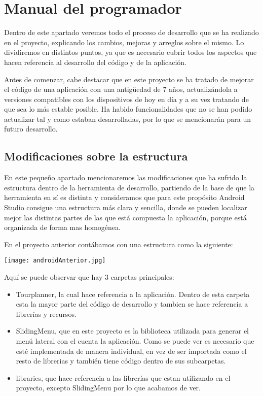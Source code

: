 \section{Manual del programador}

Dentro de este apartado veremos todo el proceso de desarrollo que se ha realizado en el proyecto, explicando los cambios, mejoras y arreglos sobre el mismo. Lo dividiremos en distintos puntos, ya que es necesario cubrir todos los aspectos que hacen referencia al desarrollo del código y de la aplicación.

Antes de comenzar, cabe destacar que en este proyecto se ha tratado de mejorar el código de una aplicación con una antigüedad de 7 años, actualizándola a versiones compatibles con los dispositivos de hoy en día y a su vez tratando de que sea lo más estable posible. Ha habido funcionalidades que no se han podido actualizar tal y como estaban desarrolladas, por lo que se mencionarán para un futuro desarrollo.

\subsection{Modificaciones sobre la estructura}

En este pequeño apartado mencionaremos las modificaciones que ha sufrido la estructura dentro de la herramienta de desarrollo, partiendo de la base de que la herramienta en sí es distinta y consideramos que para este propósito Android Studio consigue una estructura más clara y sencilla, donde se pueden localizar mejor las distintas partes de las que está compuesta la aplicación, porque está organizada de forma mas homogénea.

En el proyecto anterior contábamos con una estructura como la siguiente:

\texttt{[image: androidAnterior.jpg]}

Aquí se puede observar que hay 3 carpetas principales:

\begin{itemize}
\item Tourplanner, la cual hace referencia a la aplicación. Dentro de esta carpeta esta la mayor parte del código de desarrollo y tambien se hace referencia a librerías y recursos.
\item SlidingMenu, que en este proyecto es la biblioteca utilizada para generar el menú lateral con el cuenta la aplicación. Como se puede ver es necesario que esté implementada de manera individual, en vez de ser importada como el resto de librerias y también tiene código dentro de sus subcarpetas.
\item libraries, que hace referencia a las librerías que estan utilizando en el proyecto, excepto SlidingMenu por lo que acabamos de ver.
\end{itemize}

